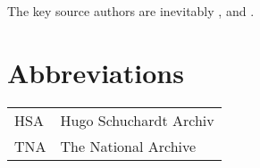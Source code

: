 \documentclass[output=paper]{langsci/langscibook}
\begin{document}
	The key source authors are inevitably \citet{Haedo1612}, \citet{Broughton1839} \citet{Pananti1841} and \citet{Frank1850}.

\section*{Abbreviations}	

\begin{tabularx}{.5\textwidth}{@{}lQ@{}}
HSA & Hugo Schuchardt Archiv\\
TNA & The National Archive \\ 
\end{tabularx}%

	{\sloppy\printbibliography[heading=subbibliography,notkeyword=this]}
\end{document}
